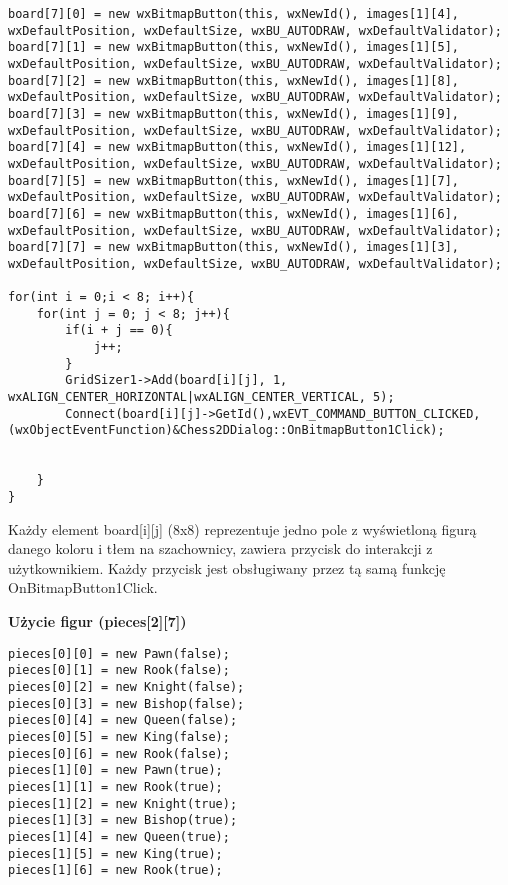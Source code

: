 \documentclass[]{report}
\begin{document}
\begin{lstlisting}
board[7][0] = new wxBitmapButton(this, wxNewId(), images[1][4], wxDefaultPosition, wxDefaultSize, wxBU_AUTODRAW, wxDefaultValidator);
board[7][1] = new wxBitmapButton(this, wxNewId(), images[1][5], wxDefaultPosition, wxDefaultSize, wxBU_AUTODRAW, wxDefaultValidator);
board[7][2] = new wxBitmapButton(this, wxNewId(), images[1][8], wxDefaultPosition, wxDefaultSize, wxBU_AUTODRAW, wxDefaultValidator);
board[7][3] = new wxBitmapButton(this, wxNewId(), images[1][9], wxDefaultPosition, wxDefaultSize, wxBU_AUTODRAW, wxDefaultValidator);
board[7][4] = new wxBitmapButton(this, wxNewId(), images[1][12], wxDefaultPosition, wxDefaultSize, wxBU_AUTODRAW, wxDefaultValidator);
board[7][5] = new wxBitmapButton(this, wxNewId(), images[1][7], wxDefaultPosition, wxDefaultSize, wxBU_AUTODRAW, wxDefaultValidator);
board[7][6] = new wxBitmapButton(this, wxNewId(), images[1][6], wxDefaultPosition, wxDefaultSize, wxBU_AUTODRAW, wxDefaultValidator);
board[7][7] = new wxBitmapButton(this, wxNewId(), images[1][3], wxDefaultPosition, wxDefaultSize, wxBU_AUTODRAW, wxDefaultValidator);

for(int i = 0;i < 8; i++){
	for(int j = 0; j < 8; j++){
		if(i + j == 0){
			j++;
		}
		GridSizer1->Add(board[i][j], 1, wxALIGN_CENTER_HORIZONTAL|wxALIGN_CENTER_VERTICAL, 5);
		Connect(board[i][j]->GetId(),wxEVT_COMMAND_BUTTON_CLICKED,(wxObjectEventFunction)&Chess2DDialog::OnBitmapButton1Click);
		
		
	}
}
\end{lstlisting}
\vspace{\baselineskip}
Każdy element board[i][j] (8x8) reprezentuje jedno pole z wyświetloną figurą danego koloru i tłem na szachownicy, zawiera przycisk do interakcji z użytkownikiem. Każdy przycisk jest obsługiwany przez tą samą funkcję OnBitmapButton1Click.
\newpage
\begin{flushleft}
\textbf{Użycie figur (pieces[2][7])}
\end{flushleft}
\begin{lstlisting}
pieces[0][0] = new Pawn(false);
pieces[0][1] = new Rook(false);
pieces[0][2] = new Knight(false);
pieces[0][3] = new Bishop(false);
pieces[0][4] = new Queen(false);
pieces[0][5] = new King(false);
pieces[0][6] = new Rook(false);
pieces[1][0] = new Pawn(true);
pieces[1][1] = new Rook(true);
pieces[1][2] = new Knight(true);
pieces[1][3] = new Bishop(true);
pieces[1][4] = new Queen(true);
pieces[1][5] = new King(true);
pieces[1][6] = new Rook(true);
\end{lstlisting}
\vspace{\baselineskip}
\end{document}
